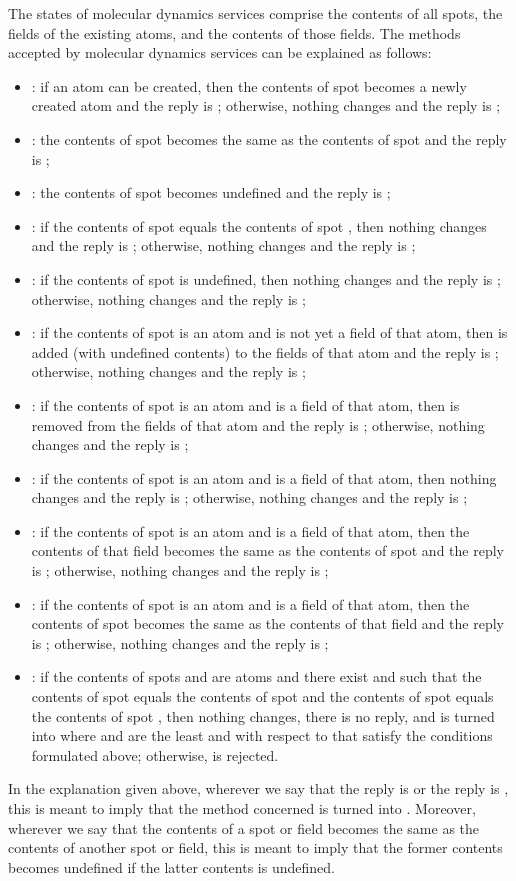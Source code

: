 \documentclass[fleqn]{llncs}
\begin{document}
The states of molecular dynamics services comprise the contents of all
spots, the fields of the existing atoms, and the contents of those
fields.
The methods accepted by molecular dynamics services can be explained as
follows:
\begin{itemize}
\item
:
if an atom can be created, then the contents of spot  becomes a newly
created atom and the reply is ; otherwise, nothing changes and
the reply is ;
\item
:
the contents of spot  becomes the same as the contents of spot 
and the reply is ;
\item
:
the contents of spot  becomes undefined and the reply is ;
\item
:
if the contents of spot  equals the contents of spot , then
nothing changes and the reply is ; otherwise, nothing changes and
the reply is ;
\item
:
if the contents of spot  is undefined, then nothing changes and the
reply is ; otherwise, nothing changes and the reply is ;
\item
:
if the contents of spot  is an atom and  is not yet a field of
that atom, then  is added (with undefined contents) to the fields of
that atom and the reply is ; otherwise, nothing changes and the
reply is ;
\item
:
if the contents of spot  is an atom and  is a field of that atom,
then  is removed from the fields of that atom and the reply is
; otherwise, nothing changes and the reply is ;
\item
:
if the contents of spot  is an atom and  is a field of that atom,
then nothing changes and the reply is ; otherwise, nothing
changes and the reply is ;
\item
:
if the contents of spot  is an atom and  is a field of that atom,
then the contents of that field becomes the same as the contents of spot
 and the reply is ; otherwise, nothing changes and the reply
is ;
\item
:
if the contents of spot  is an atom and  is a field of that atom,
then the contents of spot  becomes the same as the contents of that
field and the reply is ; otherwise, nothing changes and the reply
is ;
\item
:
if the contents of spots  and  are atoms and there exist
 and   such that the contents of spot 
equals the contents of spot  and the contents of spot  equals the
contents of spot , then nothing changes, there is no reply, and
 is turned into  where  and  are the least
 and  with respect to  that satisfy
the conditions formulated above; otherwise,  is
rejected.
\end{itemize}
In the explanation given above, wherever we say that the reply is
 or the reply is , this is meant to imply that the method
concerned is turned into .
Moreover, wherever we say that the contents of a spot or field becomes
the same as the contents of another spot or field, this is meant to
imply that the former contents becomes undefined if the latter contents
is undefined.
\end{document}

